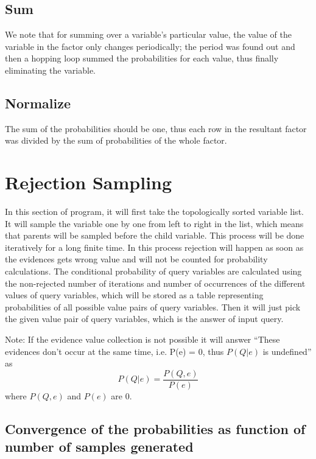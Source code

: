 \documentclass[12pt]{article}
\begin{document}
\subsection{Sum}
We note that for summing over a variable's particular value, the value of the variable in the factor only changes periodically; the period was found out and then a hopping loop summed the probabilities for each value, thus finally eliminating the variable.

\subsection{Normalize}
The sum of the probabilities should be one, thus each row in the resultant factor was divided by the sum of probabilities of the whole factor.

\section{Rejection Sampling}
In this section of program, it will first take the topologically sorted variable list. It will sample the variable one by one from left to right in the list, which means that parents will be sampled before the child variable.
This process will be done iteratively for a long finite time. In this process rejection will happen as soon as the evidences gets wrong value and will not be counted for probability calculations.
The conditional probability of query variables are calculated using the non-rejected number of iterations and number of occurrences of the different values of query variables, which will be stored as a table representing probabilities of all possible value pairs of query variables.
Then it will just pick the given value pair of query variables, which is the answer of input query.

Note: If the evidence value collection is not possible it will answer ``These evidences don't occur at the same time, i.e. P(e) = 0, thus \(P(Q|e)\) is undefined''
as
\[P(Q|e)=\frac{P(Q,e)}{P(e)}\]
where $P(Q,e)$ and $P(e)$ are $0$.

\subsection{Convergence of the probabilities as function of\\ number of samples generated}
\end{document}
